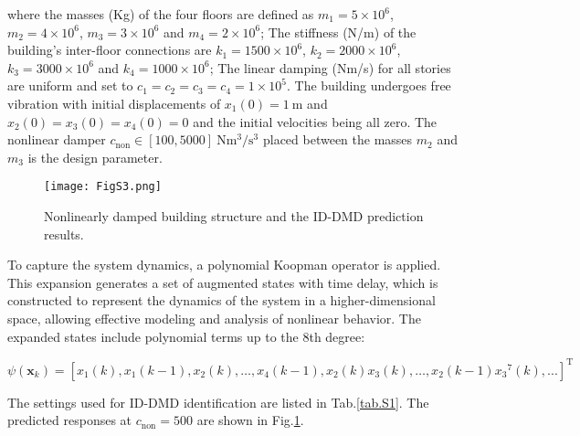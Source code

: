 \noindent where the masses (Kg) of the four floors are defined as ${m}_{1}=5\times {{10}^{6}}$, ${m}_{2}=4\times {{10}^{6}}$, ${m}_{3}=3\times {{10}^{6}}$ and ${m}_{4}=2\times {{10}^{6}}$; The stiffness (N/m) of the building’s inter-floor connections are ${k}_{1}=1500\times {{10}^{6}}$, ${k}_{2}=2000\times {{10}^{6}}$, ${k}_{3}=3000\times {{10}^{6}}$ and ${k}_{4}=1000\times {{10}^{6}}$; The linear damping (Nm/s) for all stories are uniform and set to ${c}_{1}={c}_{2}={c}_{3}={c}_{4}=1\times {{10}^{5}}$. The building undergoes free vibration with initial displacements of ${{x}_{1}}(0)=1\ \text{m}$ and ${{x}_{2}}(0)={{x}_{3}}(0)={{x}_{4}}(0)=0$ and the initial velocities being all zero. The nonlinear damper ${{c}_\text{non}}\in [100,5000]\ \text{N}{\text{m}^{3}}/{\text{s}^{3}}$  placed between the masses ${m}_{2}$ and ${m}_{3}$ is the design parameter. 

\begin{figure}[!h]
  \centering
  \texttt{[image: FigS3.png]}
  \caption{
  Nonlinearly damped building structure and the ID-DMD prediction results.
  }
  \label{S3}
\end{figure}

To capture the system dynamics, a polynomial Koopman operator is applied. This expansion generates a set of augmented states with time delay, which is constructed to represent the dynamics of the system in a higher-dimensional space, allowing effective modeling and analysis of nonlinear behavior. The expanded states include polynomial terms up to the 8th degree:

\begin{equation*}
    \psi ({\mathbf{x}_{k}})={{[{{x}_{1}}(k),{{x}_{1}}(k-1),{{x}_{2}}(k),\ldots,{{x}_{4}}(k-1),{{x}_{2}}(k){{x}_{3}}(k),\ldots,{{x}_{2}}(k-1){{x}_{3}}^{7}(k),...]}^\text{T}}
\end{equation*}

The settings used for ID-DMD identification are listed in Tab.\ref{tab.S1}. The predicted responses at ${c}_\text{non}=500$ are shown in Fig.\ref{S3}.

